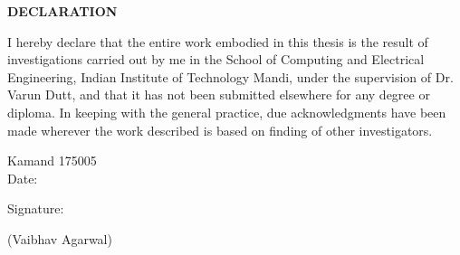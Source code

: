 \thispagestyle{empty}
\setcounter{page}{0}
\vspace*{4cm}
\centerline{\Large \bf DECLARATION}
\vspace*{2cm}
\noindent I hereby declare that the entire work embodied in this thesis is the result of investigations carried out by me in the School of Computing and Electrical Engineering, Indian Institute of Technology Mandi, under the supervision of Dr. Varun Dutt, and that it has not been submitted elsewhere for any degree or diploma. In keeping with the general practice, due acknowledgments have been made wherever the work described is based on finding of other investigators.\\[3cm]

\begin{minipage}{7cm}
{\noindent Kamand 175005} \\
{Date: }
\end{minipage}
\begin{minipage}{3cm}
	\hfill{ Signature:}
	\end{minipage}
	
	\begin{minipage}{14.5cm}
	 \hfill{(Vaibhav Agarwal)}
\end{minipage}
\clearpage
\thispagestyle{empty}
~\clearpage
